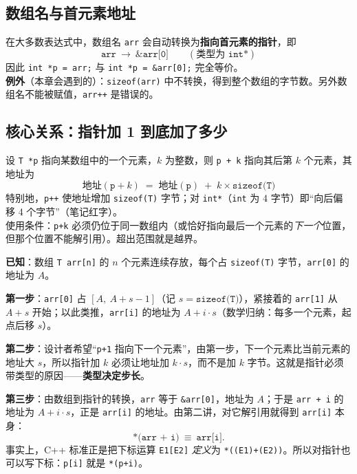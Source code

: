 \documentclass[UTF8,a4paper,11pt,fontset=none,zihao=-4]{ctexart}
\newcommand{\cpp}[1]{\lstinline[style=cpp,basicstyle=\ttfamily,numbers=none]{#1}}
\newcommand{\cc}[1]{\texttt{#1}}
\begin{document}
\subsection{数组名与首元素地址}
\begin{definitionbox}[数组到指针的转换]
在大多数表达式中，数组名 \cc{arr} 会自动转换为\textbf{指向首元素的指针}，即
\[
\texttt{arr}\ \longrightarrow\ \texttt{\&arr[0]}\qquad(\text{类型为 } \texttt{int*})
\]
因此 \cpp{int *p = arr;} 与 \cpp{int *p = &arr[0];} 完全等价。\\
\textbf{例外}（本章会遇到的）：\cc{sizeof(arr)} 中不转换，得到整个数组的字节数。另外数组名不能被赋值，\cc{arr++} 是错误的。
\end{definitionbox}

\subsection{核心关系：指针加 1 到底加了多少}
\begin{formulabox}[指针算术]
设 \cc{T *p} 指向某数组中的一个元素，$k$ 为整数，则 \cc{p + k} 指向其后第 $k$ 个元素，其地址为
\[
\boxed{\ \text{地址}(\texttt{p}+k) \;=\; \text{地址}(\texttt{p}) \;+\; k\times\texttt{sizeof(T)}\ }
\]
特别地，\cc{p++} 使地址增加 \cc{sizeof(T)} 字节；对 \cc{int*}（\cc{int} 为 4 字节）即“向后偏移 4 个字节”（笔记红字）。\\
{\small 使用条件：\cc{p+k} 必须仍位于同一数组内（或恰好指向最后一个元素的\emph{下一个}位置，但那个位置不能解引用）。超出范围就是越界。}
\end{formulabox}

\begin{proofbox}
\textbf{已知}：数组 \cc{T arr[n]} 的 $n$ 个元素连续存放，每个占 \cc{sizeof(T)} 字节，\cc{arr[0]} 的地址为 $A$。

\textbf{第一步}：\cc{arr[0]} 占 $[A,\ A+s-1]$（记 $s=\texttt{sizeof(T)}$），紧接着的 \cc{arr[1]} 从 $A+s$ 开始；以此类推，\cc{arr[i]} 的地址为 $A+i\cdot s$（数学归纳：每多一个元素，起点后移 $s$）。

\textbf{第二步}：设计者希望“\cc{p+1} 指向下一个元素”，由第一步，下一个元素比当前元素的地址大 $s$，所以指针加 $k$ 必须让地址加 $k\cdot s$，而不是加 $k$ 字节。这就是指针必须带类型的原因——\textbf{类型决定步长}。

\textbf{第三步}：由数组到指针的转换，\cc{arr} 等于 \cc{\&arr[0]}，地址为 $A$；于是 \cc{arr + i} 的地址为 $A+i\cdot s$，正是 \cc{arr[i]} 的地址。由第二讲，对它解引用就得到 \cc{arr[i]} 本身：
\[
\texttt{*(arr + i)}\ \equiv\ \texttt{arr[i]}.
\]
事实上，C++ 标准正是把下标运算 \cc{E1[E2]} \emph{定义}为 \cc{*((E1)+(E2))}。所以对指针也可以写下标：\cc{p[i]} 就是 \cc{*(p+i)}。
\end{proofbox}
\end{document}
